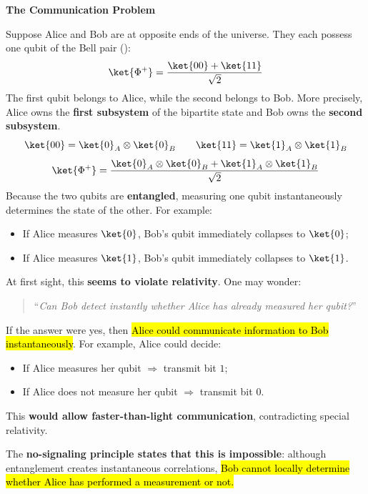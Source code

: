 \highspace
\begin{flushleft}
    \textcolor{Red2}{ \textbf{The Communication Problem}}
\end{flushleft}
Suppose Alice and Bob are at opposite ends of the universe. They each possess one qubit of the Bell pair ():
\begin{equation*}
    \ket{\Phi^{+}}
    =
    \frac{\ket{00}+\ket{11}}{\sqrt{2}}
\end{equation*}
The first qubit belongs to Alice, while the second belongs to Bob. More precisely, Alice owns the \textbf{first subsystem} of the bipartite state and Bob owns the \textbf{second subsystem}.
\begin{equation*}
    \ket{00} = \ket{0}_{A} \otimes \ket{0}_{B} \qquad \ket{11} = \ket{1}_{A} \otimes \ket{1}_{B}
\end{equation*}
\begin{equation*}
    \ket{\Phi^{+}} = \frac{\ket{0}_{A} \otimes \ket{0}_{B} + \ket{1}_{A} \otimes \ket{1}_{B}}{\sqrt{2}}
\end{equation*}
Because the two qubits are \textbf{entangled}, measuring one qubit instantaneously determines the state of the other. For example:
\begin{itemize}
    \item If Alice measures $\ket{0}$, Bob's qubit immediately collapses to $\ket{0}$;
    \item If Alice measures $\ket{1}$, Bob's qubit immediately collapses to $\ket{1}$.
\end{itemize}
\textcolor{Red2}{} At first sight, this \textbf{seems to violate relativity}. One may wonder:
\begin{quote}
    ``\emph{Can Bob detect instantly whether Alice has already measured her qubit?}''
\end{quote}
If the answer were yes, then \hl{Alice could communicate information to Bob instantaneously}. For example, Alice could decide:
\begin{itemize}
    \item If Alice measures her qubit $\Rightarrow$ transmit bit $1$;
    \item If Alice does not measure her qubit $\Rightarrow$ transmit bit $0$.
\end{itemize}
This \textbf{would allow faster-than-light communication}, contradicting special relativity.

\highspace
The \textbf{no-signaling principle states that this is impossible}: although entanglement creates instantaneous correlations, \hl{Bob cannot locally determine whether Alice has performed a measurement or not.}

